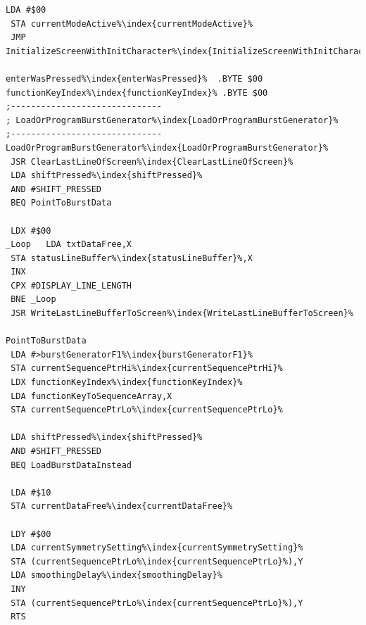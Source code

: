 \begin{minipage}[b]{0.33\linewidth}
\begin{lrbox}{\mybox}
\begin{lstlisting}[basicstyle=\ttfamily\tiny,escapechar=\%]
 LDA #$00
 STA currentModeActive%\index{currentModeActive}%
 JMP InitializeScreenWithInitCharacter%\index{InitializeScreenWithInitCharacter}%

enterWasPressed%\index{enterWasPressed}%  .BYTE $00
functionKeyIndex%\index{functionKeyIndex}% .BYTE $00
;------------------------------
; LoadOrProgramBurstGenerator%\index{LoadOrProgramBurstGenerator}%
;------------------------------
LoadOrProgramBurstGenerator%\index{LoadOrProgramBurstGenerator}%
 JSR ClearLastLineOfScreen%\index{ClearLastLineOfScreen}%
 LDA shiftPressed%\index{shiftPressed}%
 AND #SHIFT_PRESSED
 BEQ PointToBurstData

 LDX #$00
_Loop   LDA txtDataFree,X
 STA statusLineBuffer%\index{statusLineBuffer}%,X
 INX
 CPX #DISPLAY_LINE_LENGTH
 BNE _Loop
 JSR WriteLastLineBufferToScreen%\index{WriteLastLineBufferToScreen}%

PointToBurstData
 LDA #>burstGeneratorF1%\index{burstGeneratorF1}%
 STA currentSequencePtrHi%\index{currentSequencePtrHi}%
 LDX functionKeyIndex%\index{functionKeyIndex}%
 LDA functionKeyToSequenceArray,X
 STA currentSequencePtrLo%\index{currentSequencePtrLo}%

 LDA shiftPressed%\index{shiftPressed}%
 AND #SHIFT_PRESSED
 BEQ LoadBurstDataInstead

 LDA #$10
 STA currentDataFree%\index{currentDataFree}%

 LDY #$00
 LDA currentSymmetrySetting%\index{currentSymmetrySetting}%
 STA (currentSequencePtrLo%\index{currentSequencePtrLo}%),Y
 LDA smoothingDelay%\index{smoothingDelay}%
 INY
 STA (currentSequencePtrLo%\index{currentSequencePtrLo}%),Y
 RTS

\end{lstlisting}
\end{lrbox}%
\scalebox{0.8}{\usebox{\mybox}}
\end{minipage}
\hspace{-0.1cm}
